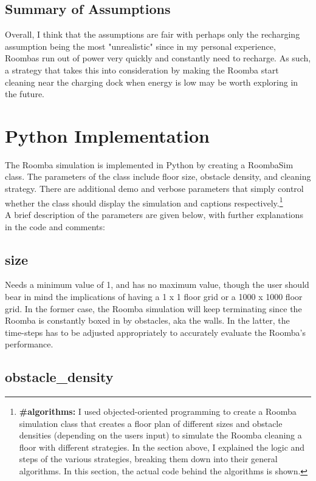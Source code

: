\documentclass[11pt]{article}
\begin{document}
\subsection{Summary of Assumptions}

Overall, I think that the assumptions are fair with perhaps only the
recharging assumption being the most "unrealistic" since in my personal
experience, Roombas run out of power very quickly and constantly need to
recharge. As such, a strategy that takes this into consideration by
making the Roomba start cleaning near the charging dock when energy is
low may be worth exploring in the future.
\newpage
    \section{Python Implementation}

The Roomba simulation is implemented in Python by creating a RoombaSim
class. The parameters of the class include floor size, obstacle density,
and cleaning strategy. There are additional demo and verbose parameters
that simply control whether the class should display the simulation and
captions respectively.\footnote{\textbf{\#algorithms:} I used objected-oriented programming to create a Roomba simulation class that creates a floor plan of different sizes and obstacle densities (depending on the users input) to simulate the Roomba cleaning a floor with different strategies. In the section above, I explained the logic and steps of the various strategies, breaking them down into their general algorithms. In this section, the actual code behind the algorithms is shown. }\\

A brief description of the parameters are given below, with further
explanations in the code and comments:

\subsection*{size}

Needs a minimum value of 1, and has no maximum value, though the user
should bear in mind the implications of having a 1 x 1 floor grid or a
1000 x 1000 floor grid. In the former case, the Roomba simulation will
keep terminating since the Roomba is constantly boxed in by obstacles,
aka the walls. In the latter, the time-steps has to be adjusted
appropriately to accurately evaluate the Roomba's performance.

\subsection*{obstacle\_density}
\end{document}

